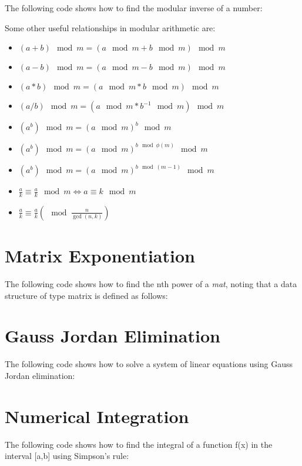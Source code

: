 The following code shows how to find the modular inverse of a number:



Some other useful relationships in modular arithmetic are:

\begin{itemize}
\item $ (a+b) \mod m = (a \mod m + b \mod m) \mod m $
\item $ (a-b) \mod m = (a \mod m - b \mod m) \mod m $
\item $ (a*b) \mod m = (a \mod m * b \mod m) \mod m $
\item $ (a/b) \mod m = (a \mod m * b^{-1} \mod m) \mod m $
\item $ (a^b) \mod m = (a \mod m)^b \mod m $
\item $ (a^b) \mod m = (a \mod m)^{b \mod \phi(m)} \mod m $
\item $ (a^b) \mod m = (a \mod m)^{b \mod (m-1)} \mod m $
\item $ \frac{a}{k} \equiv \frac{a}{k} \mod m \iff a \equiv k \mod m $
\item $ \frac{a}{k} \equiv \frac{a}{k} \left( \mod \frac{n}{\gcd (n,k)}\right)$
\end{itemize}


\section{Matrix Exponentiation}

The following code shows how to find the nth power of a \textit{mat}, noting that a data structure of type matrix is defined as follows:




\section{Gauss Jordan Elimination}

The following code shows how to solve a system of linear equations using Gauss Jordan elimination:




\section{Numerical Integration}

The following code shows how to find the integral of a function f(x) in the interval [a,b] using Simpson's rule:

